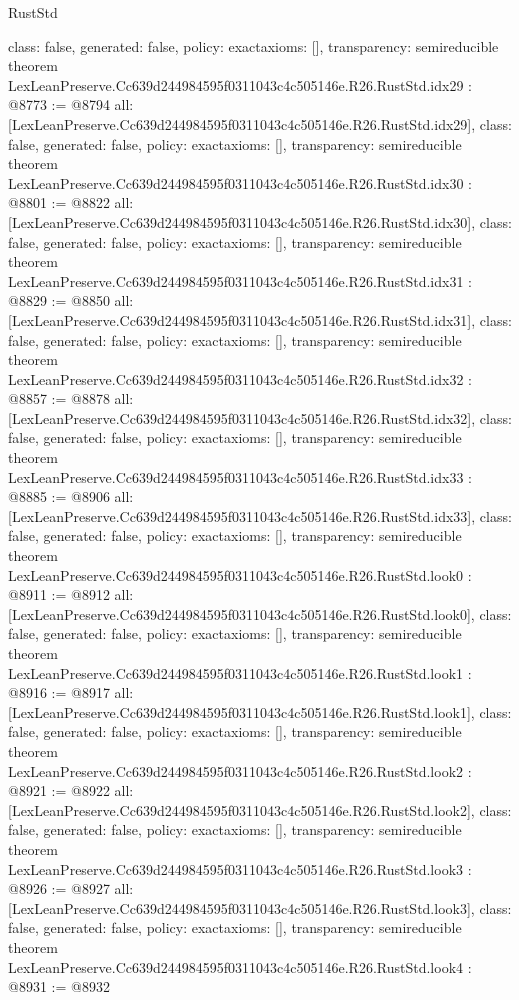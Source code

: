 \begin{lexlean}{RustStd}
\begin{coremodule}
{  class: false,
  generated: false,
  policy: exact{axioms: []},
  transparency: semireducible
}
theorem LexLeanPreserve.Cc639d244984595f0311043c4c505146e.R26.RustStd.idx29 : @8773 := @8794 {
  all: [LexLeanPreserve.Cc639d244984595f0311043c4c505146e.R26.RustStd.idx29],
  class: false,
  generated: false,
  policy: exact{axioms: []},
  transparency: semireducible
}
theorem LexLeanPreserve.Cc639d244984595f0311043c4c505146e.R26.RustStd.idx30 : @8801 := @8822 {
  all: [LexLeanPreserve.Cc639d244984595f0311043c4c505146e.R26.RustStd.idx30],
  class: false,
  generated: false,
  policy: exact{axioms: []},
  transparency: semireducible
}
theorem LexLeanPreserve.Cc639d244984595f0311043c4c505146e.R26.RustStd.idx31 : @8829 := @8850 {
  all: [LexLeanPreserve.Cc639d244984595f0311043c4c505146e.R26.RustStd.idx31],
  class: false,
  generated: false,
  policy: exact{axioms: []},
  transparency: semireducible
}
theorem LexLeanPreserve.Cc639d244984595f0311043c4c505146e.R26.RustStd.idx32 : @8857 := @8878 {
  all: [LexLeanPreserve.Cc639d244984595f0311043c4c505146e.R26.RustStd.idx32],
  class: false,
  generated: false,
  policy: exact{axioms: []},
  transparency: semireducible
}
theorem LexLeanPreserve.Cc639d244984595f0311043c4c505146e.R26.RustStd.idx33 : @8885 := @8906 {
  all: [LexLeanPreserve.Cc639d244984595f0311043c4c505146e.R26.RustStd.idx33],
  class: false,
  generated: false,
  policy: exact{axioms: []},
  transparency: semireducible
}
theorem LexLeanPreserve.Cc639d244984595f0311043c4c505146e.R26.RustStd.look0 : @8911 := @8912 {
  all: [LexLeanPreserve.Cc639d244984595f0311043c4c505146e.R26.RustStd.look0],
  class: false,
  generated: false,
  policy: exact{axioms: []},
  transparency: semireducible
}
theorem LexLeanPreserve.Cc639d244984595f0311043c4c505146e.R26.RustStd.look1 : @8916 := @8917 {
  all: [LexLeanPreserve.Cc639d244984595f0311043c4c505146e.R26.RustStd.look1],
  class: false,
  generated: false,
  policy: exact{axioms: []},
  transparency: semireducible
}
theorem LexLeanPreserve.Cc639d244984595f0311043c4c505146e.R26.RustStd.look2 : @8921 := @8922 {
  all: [LexLeanPreserve.Cc639d244984595f0311043c4c505146e.R26.RustStd.look2],
  class: false,
  generated: false,
  policy: exact{axioms: []},
  transparency: semireducible
}
theorem LexLeanPreserve.Cc639d244984595f0311043c4c505146e.R26.RustStd.look3 : @8926 := @8927 {
  all: [LexLeanPreserve.Cc639d244984595f0311043c4c505146e.R26.RustStd.look3],
  class: false,
  generated: false,
  policy: exact{axioms: []},
  transparency: semireducible
}
theorem LexLeanPreserve.Cc639d244984595f0311043c4c505146e.R26.RustStd.look4 : @8931 := @8932 {
}
\end{coremodule}
\end{lexlean}
